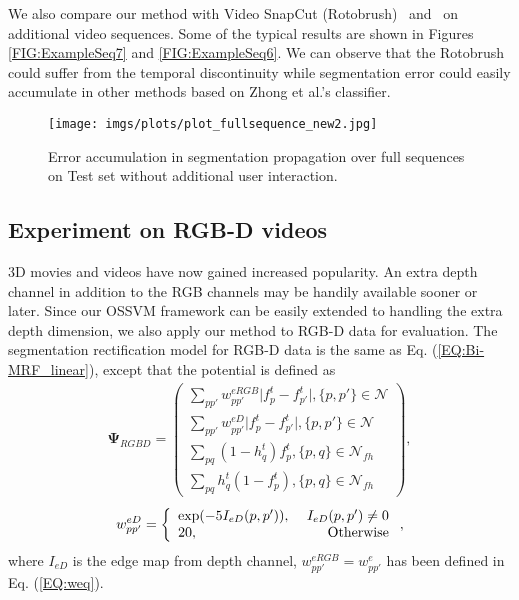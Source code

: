 \documentclass[10pt,journal,compsoc]{newIEEEtran}
\begin{document}
We also compare our method with Video SnapCut (Rotobrush)~\cite{Bai09VideoSnapCut_SIGGRAPH} and~\cite{Zhong2012UDC_SIGGRAPHAsia} on additional video sequences. Some of the typical results are shown in Figures \ref{FIG:ExampleSeq7} and \ref{FIG:ExampleSeq6}. We can observe that the Rotobrush could suffer from the temporal discontinuity while segmentation error could easily accumulate in other methods based on Zhong et al.'s classifier. 
\begin{figure}[!t]
	\centering
	\texttt{[image: imgs/plots/plot\_fullsequence\_new2.jpg]}
	\caption{Error accumulation in segmentation propagation over full sequences on Test set without additional user interaction.  }\label{FIG:Rst_SeqPropag2}\vspace{-0.5cm}
\end{figure}\subsection{Experiment on RGB-D videos}
3D movies and videos have now gained increased popularity. An extra depth channel in addition to the RGB channels may be handily available sooner or later. Since our OSSVM framework can be easily extended to handling the extra depth dimension, we also apply our method to RGB-D data for evaluation. The segmentation rectification model for RGB-D data is the same as Eq. (\ref{EQ:Bi-MRF_linear}), except that the potential is defined as
\begin{equation}\label{EQ:DefinePsiRGBD}
\begin{split}
\mathbf{\Psi}_{RGBD} = \left(\begin{array}{l}
\sum_{pp'}w^{eRGB}_{pp'} \big|f^{t}_p-{f^{t}_{p'}}\big|,\{p,p'\}\in\mathcal{N} \\
\sum_{pp'}w^{eD}_{pp'} \big|f^{t}_p-{f^{t}_{p'}}\big|,\{p,p'\}\in\mathcal{N}\\
\sum_{pq}(1-h^t_q)f^{t}_p,\{p,q\}\in\mathcal{N}_{fh} \\
\sum_{pq}h^t_q(1-f^{t}_p),\{p,q\}\in\mathcal{N}_{fh}
\end{array}\right),
\end{split}
\end{equation}\begin{equation}\label{EQ:weqRGBD}
w^{eD}_{pp'}=\left\{\begin{array}{lr}
\exp(-5I_{eD}(p,p')),~ & I_{eD}(p,p')\neq0 \\
20,~ & \hbox{Otherwise}
\end{array}
\right.,
\end{equation}
where $I_{eD}$ is the edge map from depth channel, $w^{eRGB}_{pp'}=w^e_{pp'}$ has been defined in Eq. (\ref{EQ:weq}).
\end{document}
